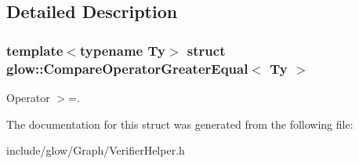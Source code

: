 \subsection{Detailed Description}
\subsubsection*{template$<$typename Ty$>$\newline
struct glow\+::\+Compare\+Operator\+Greater\+Equal$<$ Ty $>$}

Operator $>$=. 

The documentation for this struct was generated from the following file\+:\begin{DoxyCompactItemize}
\item 
include/glow/\+Graph/Verifier\+Helper.\+h\end{DoxyCompactItemize}
